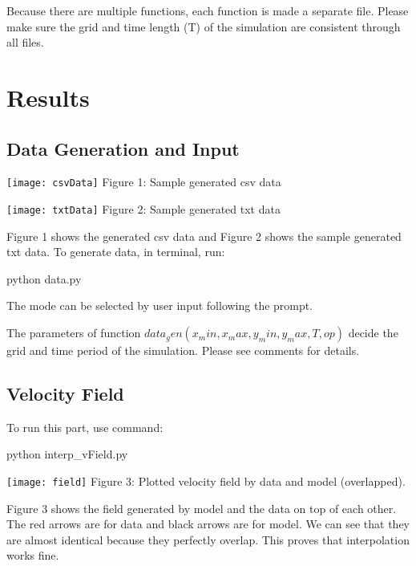 \documentclass[12pt]{article}
\begin{document}
Because there are multiple functions, each function is made a separate file. Please make sure the grid and time length (T) of the simulation are consistent through all files.

\section{Results}
\subsection{Data Generation and Input}
\begin{center}
\texttt{[image: csvData]}
\small Figure 1: Sample generated csv data
\end{center}

\begin{center}
\texttt{[image: txtData]}
\small Figure 2: Sample generated txt data
\end{center}

Figure 1 shows the generated csv data and Figure 2 shows the sample generated txt data. To generate data, in terminal, run:

\begin{center}
python data.py 
\end{center} 

 

The mode can be selected by user input following the prompt.

The parameters of function $data_gen(x_min,x_max,y_min,y_max,T,op)$ decide the grid and time period of the simulation. Please see comments for details.


\subsection{Velocity Field}
To run this part, use command:

\begin{center}
python interp\_vField.py 
\end{center} 

\begin{center}
\texttt{[image: field]}
\small Figure 3: Plotted velocity field by data and model (overlapped).
\end{center}

Figure 3 shows the field generated by model and the data on top of each other. The red arrows are for data and black arrows are for model. We can see that they are almost identical because they perfectly overlap. This proves that interpolation works fine.
\end{document}
